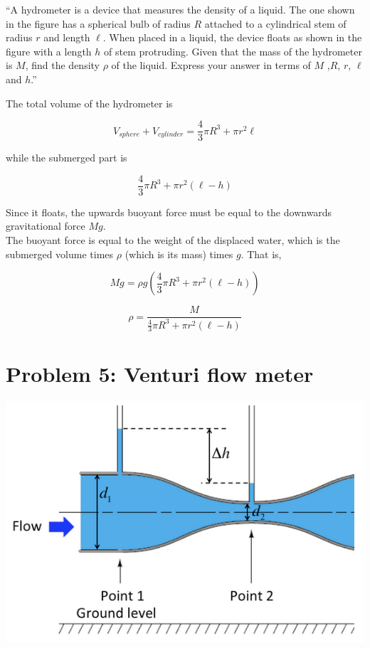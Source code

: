 \documentclass[8.01x]{subfiles}
\begin{document}
``A hydrometer is a device that measures the density of a liquid. The one shown in the figure has a spherical bulb of radius $R$ attached to a cylindrical stem of radius $r$ and length $\ell$. When placed in a liquid, the device floats as shown in the figure with a length $h$ of stem protruding. Given that the mass of the hydrometer is $M$, find the density $\rho$ of the liquid. Express your answer in terms of $M$ ,$R$, $r$, $\ell$ and $h$.''

The total volume of the hydrometer is

\begin{equation}
V_{sphere} + V_{cylinder} = \frac{4}{3} \pi R^3 + \pi r^2 \ell
\end{equation}

while the submerged part is

\begin{equation}
\frac{4}{3} \pi R^3 + \pi r^2 (\ell - h)
\end{equation}

Since it floats, the upwards buoyant force must be equal to the downwards gravitational force $M g$.\\
The buoyant force is equal to the weight of the displaced water, which is the submerged volume times $\rho$ (which is its mass) times $g$. That is,

\begin{equation}
M g = \rho g \left(\frac{4}{3} \pi R^3 + \pi r^2 (\ell - h)\right)
\end{equation}

\begin{equation}
\rho = \frac{M}{\frac{4}{3} \pi R^3 + \pi r^2 (\ell - h)}
\end{equation}

\section{Problem 5: Venturi flow meter}

\begin{center}
\includegraphics[scale=0.6]{Graphics/h10p5}
\end{center}
\end{document}
